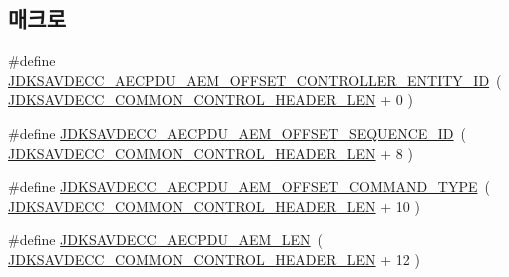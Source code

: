 \subsection*{매크로}
\begin{DoxyCompactItemize}
\item 
\#define \hyperlink{group__aecpdu__aem_ga1630cb32cb01aa15a9ca014da1159a15}{J\+D\+K\+S\+A\+V\+D\+E\+C\+C\+\_\+\+A\+E\+C\+P\+D\+U\+\_\+\+A\+E\+M\+\_\+\+O\+F\+F\+S\+E\+T\+\_\+\+C\+O\+N\+T\+R\+O\+L\+L\+E\+R\+\_\+\+E\+N\+T\+I\+T\+Y\+\_\+\+ID}~( \hyperlink{group__jdksavdecc__avtp__common__control__header_gaae84052886fb1bb42f3bc5f85b741dff}{J\+D\+K\+S\+A\+V\+D\+E\+C\+C\+\_\+\+C\+O\+M\+M\+O\+N\+\_\+\+C\+O\+N\+T\+R\+O\+L\+\_\+\+H\+E\+A\+D\+E\+R\+\_\+\+L\+EN} + 0 )
\item 
\#define \hyperlink{group__aecpdu__aem_gaaf7c627ae7a536ec42d5ae1d985a67de}{J\+D\+K\+S\+A\+V\+D\+E\+C\+C\+\_\+\+A\+E\+C\+P\+D\+U\+\_\+\+A\+E\+M\+\_\+\+O\+F\+F\+S\+E\+T\+\_\+\+S\+E\+Q\+U\+E\+N\+C\+E\+\_\+\+ID}~( \hyperlink{group__jdksavdecc__avtp__common__control__header_gaae84052886fb1bb42f3bc5f85b741dff}{J\+D\+K\+S\+A\+V\+D\+E\+C\+C\+\_\+\+C\+O\+M\+M\+O\+N\+\_\+\+C\+O\+N\+T\+R\+O\+L\+\_\+\+H\+E\+A\+D\+E\+R\+\_\+\+L\+EN} + 8 )
\item 
\#define \hyperlink{group__aecpdu__aem_gae336db3c3e35b3be2ef2fe34780e4bd2}{J\+D\+K\+S\+A\+V\+D\+E\+C\+C\+\_\+\+A\+E\+C\+P\+D\+U\+\_\+\+A\+E\+M\+\_\+\+O\+F\+F\+S\+E\+T\+\_\+\+C\+O\+M\+M\+A\+N\+D\+\_\+\+T\+Y\+PE}~( \hyperlink{group__jdksavdecc__avtp__common__control__header_gaae84052886fb1bb42f3bc5f85b741dff}{J\+D\+K\+S\+A\+V\+D\+E\+C\+C\+\_\+\+C\+O\+M\+M\+O\+N\+\_\+\+C\+O\+N\+T\+R\+O\+L\+\_\+\+H\+E\+A\+D\+E\+R\+\_\+\+L\+EN} + 10 )
\item 
\#define \hyperlink{group__aecpdu__aem_ga225c1b8a460f2631846dee37713da1bc}{J\+D\+K\+S\+A\+V\+D\+E\+C\+C\+\_\+\+A\+E\+C\+P\+D\+U\+\_\+\+A\+E\+M\+\_\+\+L\+EN}~( \hyperlink{group__jdksavdecc__avtp__common__control__header_gaae84052886fb1bb42f3bc5f85b741dff}{J\+D\+K\+S\+A\+V\+D\+E\+C\+C\+\_\+\+C\+O\+M\+M\+O\+N\+\_\+\+C\+O\+N\+T\+R\+O\+L\+\_\+\+H\+E\+A\+D\+E\+R\+\_\+\+L\+EN} + 12 )
\end{DoxyCompactItemize}
